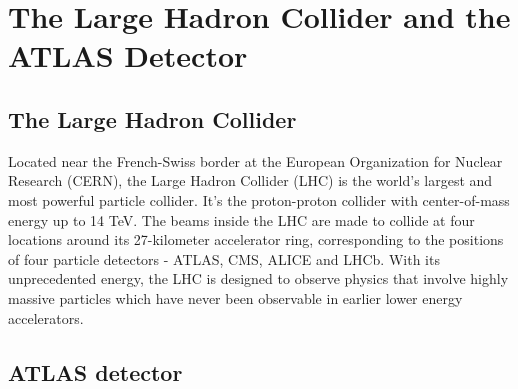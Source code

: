 \chapter{The Large Hadron Collider and the ATLAS Detector}

\section{The Large Hadron Collider}
Located near the French-Swiss border at the European Organization for Nuclear Research (CERN),
the Large Hadron Collider (LHC) is the world's largest and most powerful particle collider.
It's the proton-proton collider with center-of-mass energy up to 14 TeV.
The beams inside the LHC are made to collide at four locations around its 27-kilometer accelerator ring, 
corresponding to the positions of four particle detectors - ATLAS, CMS, ALICE and LHCb.
With its unprecedented energy, the LHC is designed to observe physics that involve highly massive particles
which have never been observable in earlier lower energy accelerators.




\section{ATLAS detector}



